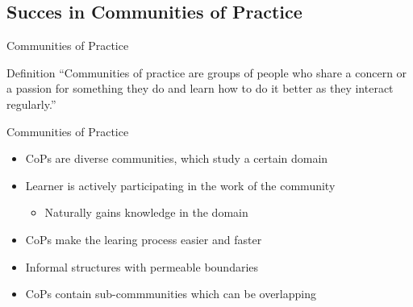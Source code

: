 \subsection{Succes in Communities of Practice}
\begin{frame}{Communities of Practice}
  \begin{block}{Definition}
    ``Communities of practice are groups of people who share a concern or a
    passion for something they do and learn how to do it better as they interact regularly.'' \cite{Weng98}
  \end{block}
\end{frame}

\begin{frame}{Communities of Practice}
  \begin{itemize}
    \item CoPs are diverse communities, which study a certain domain
    \item Learner is actively participating in the work of the community
    \begin{itemize}
        \item Naturally gains knowledge in the domain
    \end{itemize}
    \item CoPs make the learing process easier \cite{SaAr05} and faster \cite{CuZe05}
    \item Informal structures with permeable boundaries \cite{RKJa15}
    \item CoPs contain sub-commmunities which can be overlapping
  \end{itemize}
\end{frame}


